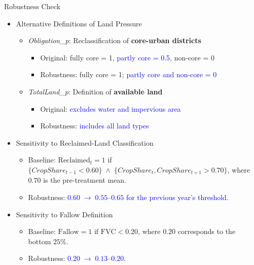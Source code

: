 \documentclass[10pt, xcolor=x11names,compress, aspectratio=169]{beamer}
\begin{document}
\begin{frame}{Robustness Check}
\begin{itemize}
    \item Alternative Definitions of Land Pressure
    \begin{itemize}
    
        \item \textit{Obligation\_p}: Reclassification of \textbf{core-urban districts}  
        \begin{itemize}
            \item Original: fully core = 1, \textcolor{blue}{partly core = 0.5}, non-core = 0  
            \item Robustness: fully core = 1; \textcolor{blue}{partly core and non-core = 0}
        \end{itemize}

        \item \textit{TotalLand\_p}: Definition of \textbf{available land}  
        \begin{itemize}
            \item Original: \textcolor{blue}{excludes water and impervious area}
            \item Robustness: \textcolor{blue}{includes all land types}
        \end{itemize}
        \end{itemize}
    \item Sensitivity to Reclaimed-Land Classification
    \begin{itemize}
        \item Baseline: 
        $\text{Reclaimed}_t = 1$ if 
        $\{CropShare_{t-1} < 0.60\} \;\land\; 
        \{CropShare_t, CropShare_{t+1} > 0.70\}$, 
        where $0.70$ is the pre-treatment mean.
        \item Robustness:  
        \textcolor{blue}{$0.60 \;\rightarrow\; 0.55\text{–}0.65$ for the previous year's threshold.}
    \end{itemize}

    \item Sensitivity to Fallow Definition
    \begin{itemize}
        \item Baseline: 
        $\text{Fallow}=1$ if $\text{FVC} < 0.20$, 
        where $0.20$ corresponds to the bottom $25\%$.
        \item Robustness: 
        \textcolor{blue}{$0.20 \;\rightarrow\; 0.13\text{–}0.20$.}
     \end{itemize}
\end{itemize}
\end{frame}
\end{document}
